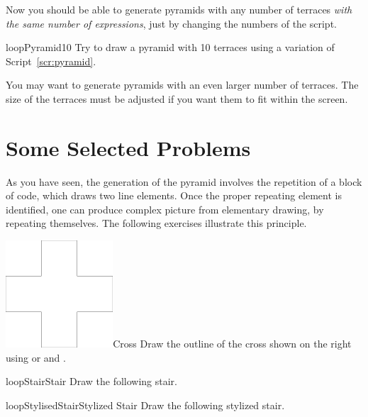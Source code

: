 Now you should be able to generate pyramids with any number of
terraces \emph{with the same number of expressions}, just by changing
the numbers of the script.

\begin{exofig}{loopPyramid10} \label{exo:pyramid}
Try to draw a pyramid with 10 terraces using a variation of Script~\ref{scr:pyramid}.
\end{exofig}

You may want to generate pyramids with an even larger number of
terraces. The size of the terraces must be adjusted if you want
them to fit within the screen.

\section{Some Selected Problems}
As you have seen, the generation of the pyramid involves the
repetition of a block of code, which draws two line elements. Once the
proper repeating element is identified, one can produce complex
picture from elementary drawing, by repeating themselves.  The
following exercises illustrate this principle.

\begin{exofigwithsizeandtitle}{\includegraphics[width=4cm]{loopCross}}{Cross} \label{exo:redcross}
Draw the outline of the cross shown on the right using \turnLeft or \turnRight and
\timesRepeat.
\end{exofigwithsizeandtitle}


\begin{exofigwithtitle}{loopStair}{Stair}\label{exo:stair}
Draw the following stair.
\end{exofigwithtitle}



\begin{exofigwithtitle}{loopStylisedStair}{Stylized Stair}\label{exo:stylizedstair}
Draw the following stylized stair.
\end{exofigwithtitle}

